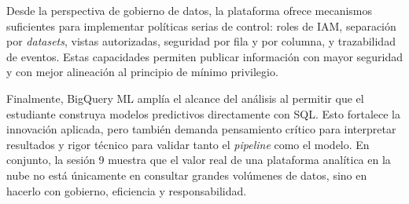 \documentclass[12pt]{article}
\begin{document}
Desde la perspectiva de gobierno de datos, la plataforma ofrece mecanismos suficientes para implementar políticas serias de control: roles de IAM, separación por \textit{datasets}, vistas autorizadas, seguridad por fila y por columna, y trazabilidad de eventos. Estas capacidades permiten publicar información con mayor seguridad y con mejor alineación al principio de mínimo privilegio.

Finalmente, BigQuery ML amplía el alcance del análisis al permitir que el estudiante construya modelos predictivos directamente con SQL. Esto fortalece la innovación aplicada, pero también demanda pensamiento crítico para interpretar resultados y rigor técnico para validar tanto el \textit{pipeline} como el modelo. En conjunto, la sesión 9 muestra que el valor real de una plataforma analítica en la nube no está únicamente en consultar grandes volúmenes de datos, sino en hacerlo con gobierno, eficiencia y responsabilidad.

\newpage
\printbibliography
\end{document}
